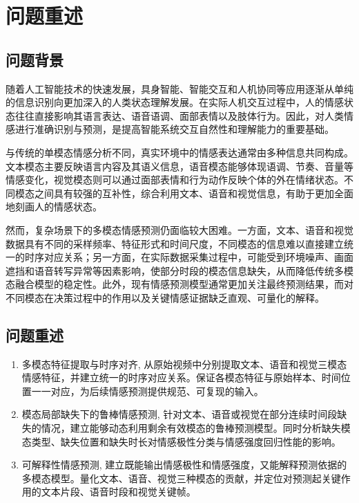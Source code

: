 \section{问题重述}

\subsection{问题背景}
随着人工智能技术的快速发展，具身智能、智能交互和人机协同等应用逐渐从单纯的信息识别向更加深入的人类状态理解发展。在实际人机交互过程中，人的情感状态往往直接影响其语言表达、语音语调、面部表情以及肢体行为。因此，对人类情感进行准确识别与预测，是提高智能系统交互自然性和理解能力的重要基础。

与传统的单模态情感分析不同，真实环境中的情感表达通常由多种信息共同构成。文本模态主要反映语言内容及其语义信息，语音模态能够体现语调、节奏、音量等情感变化，视觉模态则可以通过面部表情和行为动作反映个体的外在情绪状态。不同模态之间具有较强的互补性，综合利用文本、语音和视觉信息，有助于更加全面地刻画人的情感状态。

然而，复杂场景下的多模态情感预测仍面临较大困难。一方面，文本、语音和视觉数据具有不同的采样频率、特征形式和时间尺度，不同模态的信息难以直接建立统一的时序对应关系；另一方面，在实际数据采集过程中，可能受到环境噪声、画面遮挡和语音转写异常等因素影响，使部分时段的模态信息缺失，从而降低传统多模态融合模型的稳定性。此外，现有情感预测模型通常更加关注最终预测结果，而对不同模态在决策过程中的作用以及关键情感证据缺乏直观、可量化的解释。

\subsection{问题重述}

\begin{enumerate}[label=\textbf{问题\arabic*:},leftmargin=*]
    \item 多模态特征提取与时序对齐,
从原始视频中分别提取文本、语音和视觉三模态情感特征，并建立统一的时序对应关系。保证各模态特征与原始样本、时间位置一一对应，为后续情感预测提供规范、可复现的输入。
    \item 模态局部缺失下的鲁棒情感预测,
针对文本、语音或视觉在部分连续时间段缺失的情况，建立能够动态利用剩余有效模态的鲁棒预测模型。同时分析缺失模态类型、缺失位置和缺失时长对情感极性分类与情感强度回归性能的影响。
    \item 可解释性情感预测,
建立既能输出情感极性和情感强度，又能解释预测依据的多模态模型。量化文本、语音、视觉三种模态的贡献，并定位对预测起关键作用的文本片段、语音时段和视觉关键帧。
\end{enumerate}

